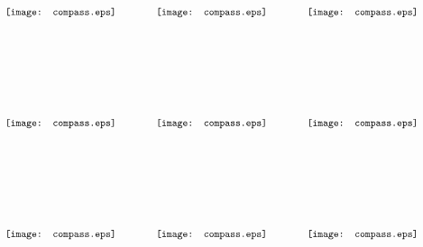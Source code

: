 \documentclass{article}
\begin{document}
\begin{figure}[h]
\begin{center}$
\arraycolsep=20pt\def\arraystretch{9.2}
\begin{array}{ccc}
\texttt{[image: compass.eps]} &
\texttt{[image: compass.eps]} &
\texttt{[image: compass.eps]} \\
\texttt{[image: compass.eps]} &
\texttt{[image: compass.eps]} &
\texttt{[image: compass.eps]} \\
\texttt{[image: compass.eps]} &
\texttt{[image: compass.eps]} &
\texttt{[image: compass.eps]}
\end{array}$
\end{center}
\end{figure}
\end{document}
